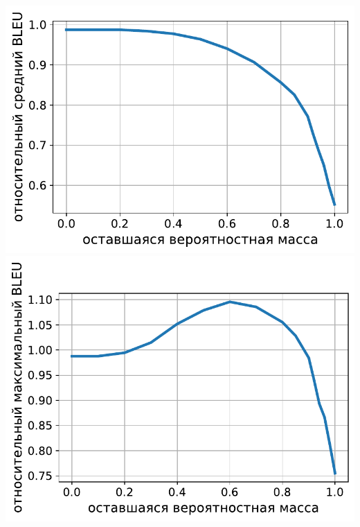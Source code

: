 \documentclass[a4paper, 12pt]{extarticle}
\begin{document}
\begin{center}
\includegraphics[scale=0.5]{avg-bleu-nucleus-sampling.pdf}
\includegraphics[scale=0.5]{max-bleu-nucleus-sampling.pdf}
\end{center}
\end{document}
